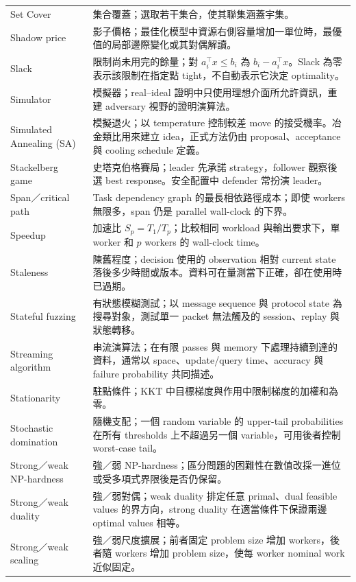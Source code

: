 \documentclass[11pt,a4paper,oneside,openany]{book}
\begin{document}
\begin{longtable}{@{}>{\raggedright\arraybackslash}p{}p{}@{}}
Set Cover & 集合覆蓋；選取若干集合，使其聯集涵蓋宇集。 \\
Shadow price & 影子價格；最佳化模型中資源右側容量增加一單位時，最優值的局部邊際變化或其對偶解讀。 \\
Slack & 限制尚未用完的餘量；對 $a_i^\top x\le b_i$ 為 $b_i-a_i^\top x$。Slack 為零表示該限制在指定點 tight，不自動表示它決定 optimality。 \\
Simulator & 模擬器；real--ideal 證明中只使用理想介面所允許資訊，重建 adversary 視野的證明演算法。 \\
Simulated Annealing (SA) & 模擬退火；以 temperature 控制較差 move 的接受機率。冶金類比用來建立 idea，正式方法仍由 proposal、acceptance 與 cooling schedule 定義。 \\
Stackelberg game & 史塔克伯格賽局；leader 先承諾 strategy，follower 觀察後選 best response。安全配置中 defender 常扮演 leader。 \\
Span／critical path & Task dependency graph 的最長相依路徑成本；即使 workers 無限多，span 仍是 parallel wall-clock 的下界。 \\
Speedup & 加速比 $S_p=T_1/T_p$；比較相同 workload 與輸出要求下，單 worker 和 $p$ workers 的 wall-clock time。 \\
Staleness & 陳舊程度；decision 使用的 observation 相對 current state 落後多少時間或版本。資料可在量測當下正確，卻在使用時已過期。 \\
Stateful fuzzing & 有狀態模糊測試；以 message sequence 與 protocol state 為搜尋對象，測試單一 packet 無法觸及的 session、replay 與狀態轉移。 \\
Streaming algorithm & 串流演算法；在有限 passes 與 memory 下處理持續到達的資料，通常以 space、update/query time、accuracy 與 failure probability 共同描述。 \\
Stationarity & 駐點條件；KKT 中目標梯度與作用中限制梯度的加權和為零。 \\
Stochastic domination & 隨機支配；一個 random variable 的 upper-tail probabilities 在所有 thresholds 上不超過另一個 variable，可用後者控制 worst-case tail。 \\
Strong／weak NP-hardness & 強／弱 NP-hardness；區分問題的困難性在數值改採一進位或受多項式界限後是否仍保留。 \\
Strong／weak duality & 強／弱對偶；weak duality 排定任意 primal、dual feasible values 的界方向，strong duality 在適當條件下保證兩邊 optimal values 相等。 \\
Strong／weak scaling & 強／弱尺度擴展；前者固定 problem size 增加 workers，後者隨 workers 增加 problem size，使每 worker nominal work 近似固定。 \\

\end{longtable}
\end{document}
